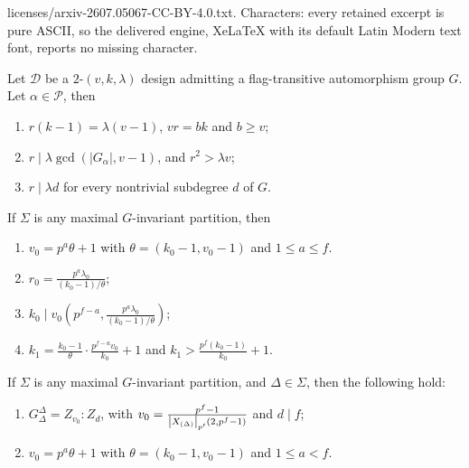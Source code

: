 \documentclass[10pt,a4paper]{amsart}
\renewcommand{\geq}{\geqslant}
\renewcommand{\leq}{\leqslant}
\begin{document}
licenses/arxiv-2607.05067-CC-BY-4.0.txt. Characters: every retained excerpt is pure ASCII, so the delivered engine, XeLaTeX with its default Latin Modern text font, reports no missing character.
\begin{lemma} \label{lem:basic-params}
Let $\mathcal{D}$ be a $2$-$(v,k,\lambda)$ design admitting a flag-transitive
automorphism group $G$. Let $\alpha \in \mathcal{P}$, then
\begin{enumerate}
\item[\rm(i)]   $r(k-1)=\lambda(v-1)$, $vr=bk$ and $b \geq v$;
\item[\rm(ii)]  $r\mid \lambda \gcd\left(\left\vert G_\alpha\right\vert, v-1\right)$, and $r^{2}>\lambda v$;
\item[\rm(iii)]  $r\mid \lambda d$ for every nontrivial subdegree $d$ of $G$.
\end{enumerate}
\end{lemma}

\begin{lemma}
\label{SigmaMax1}If $\Sigma $ is any maximal $G$-invariant partition, then

\begin{enumerate}
\item $v_{0}=p^{a}\theta +1$ with $\theta =\left( k_{0}-1,v_{0}-1\right) $
and $1\leq a\leq f$.

\item $r_{0}=\frac{p^{a}\lambda _{0}}{\left( k_{0}-1\right) /\theta }$;

\item $k_{0}\mid v_{0}\left( p^{f-a},\frac{p^{a}\lambda _{0}}{\left(
k_{0}-1\right) /\theta }\right) $;

\item $k_{1}=\frac{k_{0}-1}{\theta }\cdot \frac{p^{f-a}v_{0}}{k_{0}}+1$ and $%
k_{1}>\frac{p^{f}(k_{0}-1)}{k_{0}}+1$.
\end{enumerate}
\end{lemma}

\begin{lemma}
\label{OndaDobro}If $\Sigma $ is any maximal $G$-invariant partition, and $\Delta \in \Sigma$, then the following hold:
\begin{enumerate}
    \item $G_{\Delta }^{\Delta }=Z_{v_{0}}:Z_{d}$, with $v_{0}=\frac{p^{f}-1}{%
\left\vert X_{(\Delta )}\right\vert _{p^{\prime }}(2,p^{f}-1)}$ and $d\mid f$;
  \item  $v_{0}=p^{a}\theta +1$ with $\theta =\left( k_{0}-1,v_{0}-1\right) $
and $1\leq a <f$.
\end{enumerate}
\end{lemma}
\end{document}
